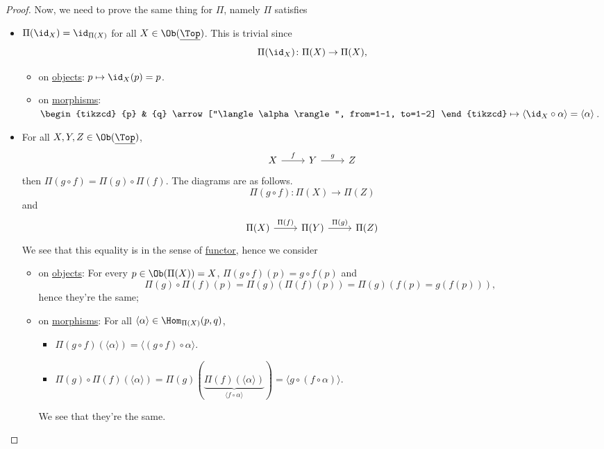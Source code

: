 \begin{proof}
	Now, we need to prove the same thing for \(\Pi\), namely \(\Pi \) satisfies
	\begin{itemize}
		\item \(\Pi (\id_{X} ) = \id_{\Pi (X)} \) for all \(X\in \Ob (\underline{\Top})\). This is trivial since
		      \[
			      \Pi (\id_{X} )\colon \Pi (X)\to \Pi (X),
		      \]
		      \begin{itemize}
			      \item on \hyperref[def:object]{objects}: \(p\mapsto \id_{X} (p) = p\).
			      \item on \hyperref[def:morphism]{morphisms}: \(\begin{tikzcd}
				            {p} & {q}
				            \arrow["\langle \alpha  \rangle ", from=1-1, to=1-2]
			            \end{tikzcd}\mapsto \langle \id_{X} \circ \alpha  \rangle = \langle \alpha  \rangle  \).
		      \end{itemize}
		\item For all \(X, Y, Z\in \Ob (\underline{\Top })\),
		      \[
			      \begin{tikzcd}
				      {X} & {Y} & {Z}
				      \arrow["f", from=1-1, to=1-2]
				      \arrow["g", from=1-2, to=1-3]
			      \end{tikzcd}
		      \]
		      then \(\Pi (g\circ f) = \Pi (g)\circ \Pi (f)\). The diagrams are as follows.
		      \[
			      \Pi (g\circ f)\colon \Pi (X)\to \Pi (Z)
		      \]
		      and
		      \[
			      \begin{tikzcd}
				      {\Pi (X)} & {\Pi (Y)} & {\Pi (Z)}
				      \arrow["\Pi (f)", from=1-1, to=1-2]
				      \arrow["\Pi (g)", from=1-2, to=1-3]
			      \end{tikzcd}
		      \]
		      We see that this equality is in the sense of \hyperref[def:functor]{functor}, hence we consider
		      \begin{itemize}
			      \item on \hyperref[def:object]{objects}: For every \(p\in \Ob (\Pi (X)) = X\), \(\Pi (g\circ f)(p) = g\circ f(p)\) and
			            \[
				            \Pi (g)\circ \Pi (f)(p) = \Pi (g)(\Pi (f)(p))=\Pi (g)(f(p)=g(f(p))),
			            \]
			            hence they're the same;
			      \item on \hyperref[def:morphism]{morphisms}: For all \(\langle \alpha  \rangle \in \Hom _{\Pi (X)}(p, q)\),
			            \begin{itemize}
				            \item \(\Pi (g\circ f)(\langle \alpha  \rangle ) = \langle (g\circ f)\circ \alpha  \rangle \).
				            \item \(\Pi (g)\circ \Pi (f)(\langle \alpha  \rangle ) = \Pi (g)(\underbrace{\Pi (f)(\langle \alpha  \rangle )}_{\langle f\circ \alpha  \rangle }) = \langle g\circ \left(f\circ \alpha \right) \rangle \).
			            \end{itemize}
			            We see that they're the same.
		      \end{itemize}
	\end{itemize}
\end{proof}
